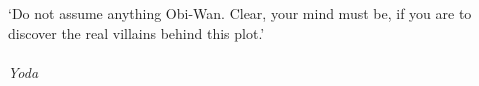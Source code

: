 
\clearpage

\narrowlinespacing

\vspace*{4mm}

`Do not assume anything Obi-Wan. Clear, your mind must be, if you are to discover the real villains behind this plot.'\\
\\
\emph{Yoda}

\normallinespacing
